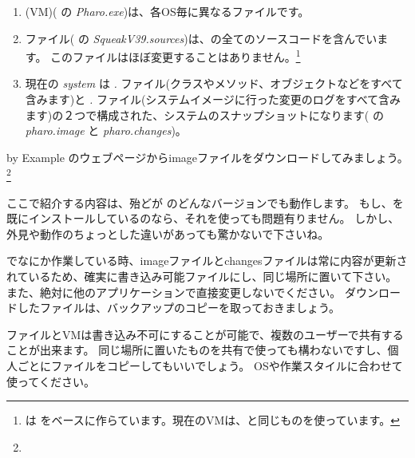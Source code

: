 \documentclass[a4paper,10pt,twoside]{book}
\begin{document}
\begin{enumerate}

  \item {} (VM)( の \textit{Pharo.exe})は、各OS毎に異なるファイルです。

  \item {}ファイル( の \emph{SqueakV39.sources})は、\pharo の全てのソースコードを含んでいます。
このファイルはほぼ変更することはありません。\footnote{\pharo は をベースに作らています。現在のVMは、\squeak と同じものを使っています。}

  \item 現在の \emph{system } は \emph{.} ファイル(クラスやメソッド、オブジェクトなどをすべて含みます)と \emph{.} ファイル(システムイメージに行った変更のログをすべて含みます)の２つで構成された、\pharo システムのスナップショットになります( の \emph{pharo.image} と \emph{pharo.changes})。
\end{enumerate}

\pharo by Example のウェブページからimageファイルをダウンロードしてみましょう。\footnote{\pbe}

ここで紹介する内容は、殆どが \pharo のどんなバージョンでも動作します。
もし、\pharo を既にインストールしているのなら、それを使っても問題有りません。
しかし、外見や動作のちょっとした違いがあっても驚かないで下さいね。

\pharo でなにか作業している時、imageファイルとchangesファイルは常に内容が更新されているため、確実に書き込み可能ファイルにし、同じ場所に置いて下さい。
また、絶対に他のアプリケーションで直接変更しないでください。
ダウンロードしたファイルは、バックアップのコピーを取っておきましょう。

 ファイルとVMは書き込み不可にすることが可能で、複数のユーザーで共有することが出来ます。
同じ場所に置いたものを共有で使っても構わないですし、個人ごとにファイルをコピーしてもいいでしょう。
OSや作業スタイルに合わせて使ってください。
\end{document}

